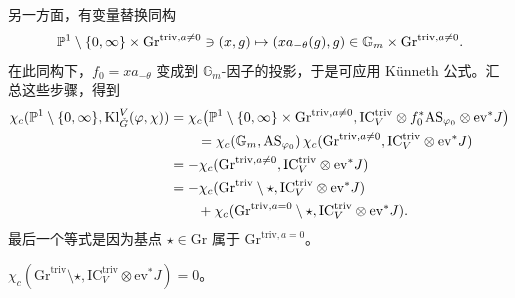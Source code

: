 另一方面，有变量替换同构
\[
\mathbb{P}^1\setminus\{0,\infty\}\times\mathrm{Gr}^{\mathrm{triv},a\neq 0}\ni(x,g)\mapsto(xa_{-\theta}(g),g)\in\mathbb{G}_m\times\mathrm{Gr}^{\mathrm{triv},a\neq 0}.
\]
在此同构下，$f_0=xa_{-\theta}$ 变成到 $\mathbb{G}_m$-因子的投影，于是可应用 Künneth 公式。汇总这些步骤，得到
\begin{align}
\chi_c(\mathbb{P}^1\setminus\{0,\infty\},\mathrm{Kl}^V_{\check G}(\varphi,\chi))
&=\chi_c\big(\mathbb{P}^1\setminus\{0,\infty\}\times\mathrm{Gr}^{\mathrm{triv},a\neq 0},\mathrm{IC}^{\mathrm{triv}}_V\otimes f_0^*\mathrm{AS}_{\varphi_0}\otimes\mathrm{ev}^*J\big)\notag\\
&\qquad=\chi_c(\mathbb{G}_m,\mathrm{AS}_{\varphi_0})\,\chi_c(\mathrm{Gr}^{\mathrm{triv},a\neq 0},\mathrm{IC}^{\mathrm{triv}}_V\otimes\mathrm{ev}^*J)\notag\\
&=-\chi_c(\mathrm{Gr}^{\mathrm{triv},a\neq 0},\mathrm{IC}^{\mathrm{triv}}_V\otimes\mathrm{ev}^*J)\notag\\
&=-\chi_c(\mathrm{Gr}^{\mathrm{triv}}\setminus\star,\mathrm{IC}^{\mathrm{triv}}_V\otimes\mathrm{ev}^*J)\notag\\
&\qquad+\chi_c(\mathrm{Gr}^{\mathrm{triv},a=0}\setminus\star,\mathrm{IC}^{\mathrm{triv}}_V\otimes\mathrm{ev}^*J).
\end{align}
最后一个等式是因为基点 $\star\in\mathrm{Gr}$ 属于 $\mathrm{Gr}^{\mathrm{triv},a=0}$。

\begin{lemma}
$\chi_c(\mathrm{Gr}^{\mathrm{triv}}\setminus\star,\mathrm{IC}^{\mathrm{triv}}_V\otimes\mathrm{ev}^*J)=0$。
\end{lemma}

